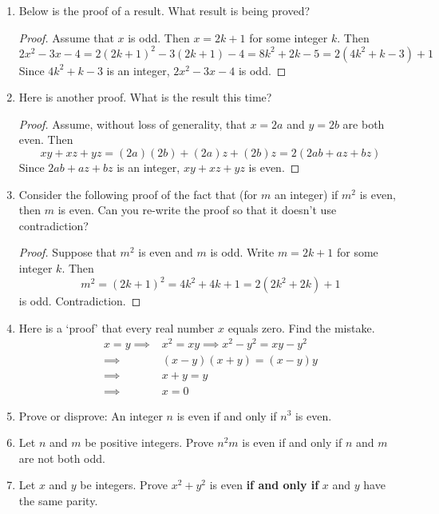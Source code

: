 \begin{exercises}{}{}
\begin{enumerate}
	  
	  
		\item Below is the proof of a result. What result is being proved?
	  \begin{proof}
	  	Assume that $x$ is odd. Then $x=2k+1$ for some integer $k$. Then
	  	\[
	  		2x^2-3x-4=2(2k+1)^2-3(2k+1)-4=8k^2+2k-5=2(4k^2+k-3)+1
	  	\]
	  	Since $4k^2+k-3$ is an integer, $2x^2-3x-4$ is odd.
	  \end{proof}
 
	
		\item Here is another proof. What is the result this time?
	  \begin{proof}
	  	Assume, without loss of generality, that $x=2a$ and $y=2b$ are both even. Then
	  	\[
	  		xy+xz+yz=(2a)(2b)+(2a)z+(2b)z=2(2ab+az+bz)
	  	\]
	  	Since $2ab+az+bz$ is an integer, $xy+xz+yz$ is even.
	  \end{proof}
	
	
    \item Consider the following proof of the fact that (for $m$ an integer) if $m^2$ is even, then $m$ is even. Can you re-write the proof so that it doesn't use contradiction?
    \begin{proof}
    	Suppose that $m^2$ is even and $m$ is odd. Write $m=2k+1$ for some integer $k$. Then
			\[
				m^2=(2k+1)^2 =4k^2+4k+1 =2(2k^2+2k) + 1
			\]
      is odd. Contradiction.
    \end{proof}	 
    
    
    \item Here is a `proof' that every real number $x$ equals zero. Find the mistake.
		\begin{align*}
			x=y\implies &x^2=xy \implies x^2-y^2=xy-y^2\\
			\implies &(x-y)(x+y)=(x-y)y\\
			\implies &x+y=y\\
			\implies &x=0
		\end{align*}
		
		
		\item\label{exs:cuberoot2} Prove or disprove: An integer $n$ is even if and only if $n^3$ is even. 
    
   
		\item Let $n$ and $m$ be positive integers. Prove $n^2m$ is even if and only if $n$ and $m$ are not both odd.
		
		
    \item Let $x$ and $y$ be integers. Prove $x^2+y^2$ is even  \textbf{if and only if} $x$ and $y$ have the same parity.
    

\end{enumerate}
\end{exercises}
